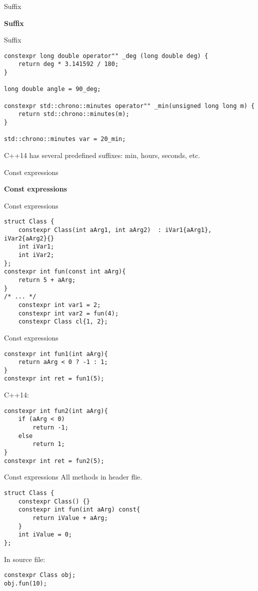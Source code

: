 \documentclass{beamer}
\begin{document}
\begin{frame}[fragile]{Suffix}
\begin{center}
{\Huge \textbf{Suffix}}
\end{center}
\end{frame}

\begin{frame}[fragile]{Suffix}
\begin{lstlisting}[style=customcpp]
constexpr long double operator"" _deg (long double deg) {
    return deg * 3.141592 / 180;
}

long double angle = 90_deg;

constexpr std::chrono::minutes operator"" _min(unsigned long long m) {
    return std::chrono::minutes(m);
}

std::chrono::minutes var = 20_min;
\end{lstlisting}
C++14 has several predefined suffixes: min, hours, seconds, etc.
\end{frame}

\begin{frame}[fragile]{Const expressions}
\begin{center}
{\Huge \textbf{Const expressions}}
\end{center}
\end{frame}

\begin{frame}[fragile]{Const expressions}
\begin{lstlisting}[style=customcpp]
struct Class {
	constexpr Class(int aArg1, int aArg2)  : iVar1{aArg1}, iVar2{aArg2}{}
	int iVar1;
	int iVar2;
};
constexpr int fun(const int aArg){
	return 5 + aArg;
}
/* ... */
	constexpr int var1 = 2;
	constexpr int var2 = fun(4);
	constexpr Class cl{1, 2};
\end{lstlisting}
\end{frame}

\begin{frame}[fragile]{Const expressions}
\begin{lstlisting}[style=customcpp]
constexpr int fun1(int aArg){
	return aArg < 0 ? -1 : 1;
}
constexpr int ret = fun1(5);
\end{lstlisting}
C++14:
\begin{lstlisting}[style=customcpp]
constexpr int fun2(int aArg){
	if (aArg < 0)
		return -1;
	else
		return 1;
}
constexpr int ret = fun2(5);
\end{lstlisting}
\end{frame}

\begin{frame}[fragile]{Const expressions}
All methods in header flie.
\begin{lstlisting}[style=customcpp]
struct Class {
	constexpr Class() {}
	constexpr int fun(int aArg) const{
		return iValue + aArg;
	}
	int iValue = 0;
};
\end{lstlisting}
In source file:
\begin{lstlisting}[style=customcpp]
constexpr Class obj;
obj.fun(10);
\end{lstlisting}
\end{frame}
\end{document}
